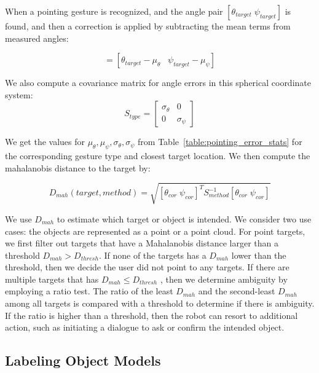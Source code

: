 \documentclass[3p]{elsarticle}
\begin{document}
When a pointing gesture is recognized, and the angle pair $[\theta_{target}\;\psi_{target}]$ is found, and then a correction is applied by subtracting the mean terms from measured angles:

\begin{equation}
[\theta_{cor}\;\;\psi_{cor}]=[\theta_{target}-\mu_{\theta}\;\;\;\psi_{target}-\mu_{\psi}]
\end{equation}
 
We also compute a covariance matrix for angle errors in this spherical coordinate system: 
\begin{equation}
S_{type} = \begin{bmatrix}
\sigma_{\theta}&0\\ 0&\sigma_{\psi}
\end{bmatrix}
\end{equation}

We get the values for $\mu_{\theta}, \mu_{\psi}, \sigma_{\theta} ,\sigma_{\psi}$ from Table~\ref{table:pointing_error_stats} for the corresponding gesture type and closest target location. We then compute the mahalanobis distance to the target by:

\begin{equation}
D_{mah}(target,method)=\sqrt{ [\theta_{cor}\;\psi_{cor}]^T S_{method}^{-1} [\theta_{cor}\;\psi_{cor}]}
\end{equation} 
 
We use $D_{mah}$ to estimate which target or object is intended. We consider two use cases: the objects are represented as a point or a point cloud. For point targets, we first filter out targets that have a Mahalanobis distance larger than a threshold $D_{mah} > D_{thresh}$. If none of the targets has a $D_{mah}$ lower than the threshold, then we decide the user did not point to any targets. If there are multiple targets that has $D_{mah} \leq D_{thresh}$ , then we determine ambiguity by employing a ratio test. The ratio of the least $D_{mah}$ and the second-least $D_{mah}$ among all targets is compared with a threshold to determine if there is ambiguity. If the ratio is higher than a threshold, then the robot can resort to additional action, such as initiating a dialogue to ask or confirm the intended object.


\subsection{Labeling Object Models}
\label{sec:object_labeling}
\end{document}
